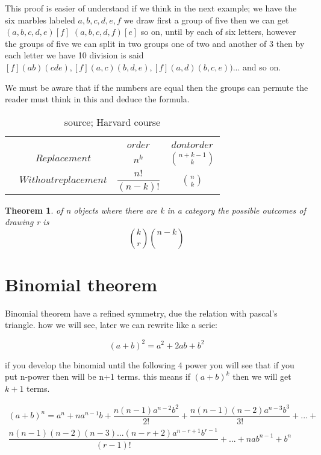 \documentclass[10pt,a4paper]{article}
\newtheorem{theorem}{Theorem}[section]
\begin{document}
This proof is easier of understand if we think in the next example; we have the six marbles labeled  $a,b,c,d,e,f$ we  draw first  a group of five then we can get $(a,b,c,d,e)[f] $ $(a,b,c,d,f)[e]$ so on, until by each of six letters, however the groups of five we can split in  two groups one of two and another of 3 then by each letter we have 10 division is said $[f](ab)(cde), [f](a,c)(b,d,e),[f](a,d)(b,c,e))... $ and so on.


We must be aware that if the numbers are equal then the groups can permute the reader must think in this and deduce the formula.


\begin{table}[h!]
\centering
    \begin{tabular}{*{4}{c|}}
      \multicolumn{2}{c}{} & \multicolumn{2}{c}{}\\\cline{3-4}
      \multicolumn{1}{c}{} &  & $order$  & $dont order$ \\\cline{2-4}
        & $Replacement$ & $n^{k}$ & ${ n +k -1 \choose k}$  \\\cline{2-4}
      & $Without replacement$ & $\dfrac{n!}{(n-k)!}$ & ${ n \choose k}$ \\\cline{2-4}
    \end{tabular}
 \caption{source; Harvard course}   
    \end{table}


\begin{theorem}
of n objects where there are k in a category the possible outcomes of drawing r is 
$$ { k \choose r} {  n-k \choose }$$

\end{theorem}



\section{Binomial theorem}

Binomial theorem have a  refined symmetry, due the relation with pascal's triangle. how we will see, later we can rewrite like a serie:

$$(a+b)^2 = a^2 +2ab+b^2$$

if you develop the binomial until the following 4 power you will see that if you put n-power then will be n+1 terms. this  means if $(a+b)^k$ then we will get $k+1$ terms. 

\begin{eqnarray}
 \nonumber (a+b)^n= a^n+na^{n-1}b+\dfrac{n(n-1)a^{n-2}b^2}{2!}+\dfrac{n(n-1)(n-2)a^{n-3}b^3}{3!}+...+  \\  \dfrac{n(n-1)(n-2)(n-3)...(n-r+2)a^{n-r+1}b^{r-1}}{(r-1)!}+...+nab^{n-1}+b^{n}
\end{eqnarray}
\end{document}
